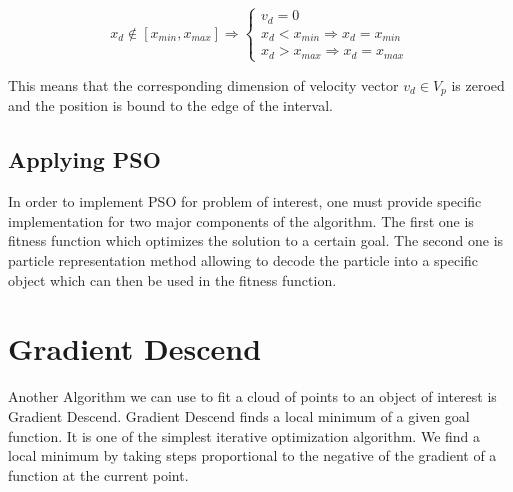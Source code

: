 \documentclass{book}
\begin{document}
\[
x_{d} \notin [x_{min}, x_{max}] \Rightarrow \left \{
\begin{array}{ll}
v_{d} = 0 \\
x_d < x_{min} \Rightarrow x_d = x_{min} \\
x_d > x_{max} \Rightarrow x_d = x_{max}
\end{array}
\right.
\]

This means that the corresponding dimension of velocity vector $v_d \in V_p$ is zeroed and the position is bound to the edge of the interval.

\section{Applying PSO}
In order to implement PSO for problem of interest, one must provide specific implementation for two major components of the algorithm. The first one is fitness function which optimizes the solution to a certain goal. The second one is particle representation method allowing to decode the particle into a specific object which can then be used in the fitness function.

\chapter{Gradient Descend}
Another Algorithm we can use to fit a cloud of points to an object of interest is Gradient Descend. Gradient Descend finds a local minimum of a given goal function. It is one of the simplest iterative optimization algorithm. We find a local minimum by taking steps proportional to the negative of the gradient of a function at the current point.

\end{document}
